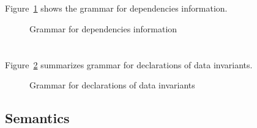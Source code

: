 
\section{}
\label{sec:func-dep}
\experimental

\nodiff

Figure~\ref{fig:gram:dep} shows the grammar for dependencies information.

\begin{figure}[htp]
  \begin{cadre}
      
    \end{cadre}
  \caption{Grammar for dependencies information}
\label{fig:gram:dep}
\end{figure}


\section{}
\label{sec:invariants}

\nodiff

Figure~\ref{fig:gram:datainvariants} summarizes grammar for declarations of data
invariants.
\begin{figure}[htbp]
  \caption{Grammar for declarations of data invariants}
\label{fig:gram:datainvariants}
\end{figure}



\subsection{Semantics}
\nodiff

